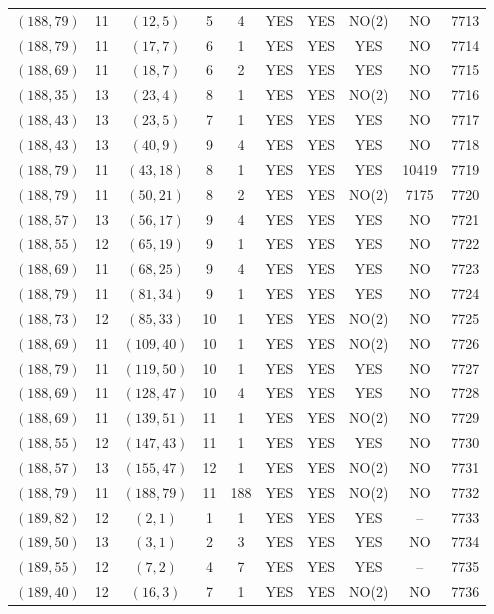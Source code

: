 \begin{longtable}{|c|c|c|c|c|c|c|c|c|c|}
$(188, 79)$ & 11 & $(12, 5)$ & 5 & 4 & YES & YES & NO(2) & NO & 7713\\
$(188, 79)$ & 11 & $(17, 7)$ & 6 & 1 & YES & YES & YES & NO & 7714\\
$(188, 69)$ & 11 & $(18, 7)$ & 6 & 2 & YES & YES & YES & NO & 7715\\
$(188, 35)$ & 13 & $(23, 4)$ & 8 & 1 & YES & YES & NO(2) & NO & 7716\\
$(188, 43)$ & 13 & $(23, 5)$ & 7 & 1 & YES & YES & YES & NO & 7717\\
$(188, 43)$ & 13 & $(40, 9)$ & 9 & 4 & YES & YES & YES & NO & 7718\\
$(188, 79)$ & 11 & $(43, 18)$ & 8 & 1 & YES & YES & YES & 10419 & 7719\\
$(188, 79)$ & 11 & $(50, 21)$ & 8 & 2 & YES & YES & NO(2) & 7175 & 7720\\
$(188, 57)$ & 13 & $(56, 17)$ & 9 & 4 & YES & YES & YES & NO & 7721\\
$(188, 55)$ & 12 & $(65, 19)$ & 9 & 1 & YES & YES & YES & NO & 7722\\
$(188, 69)$ & 11 & $(68, 25)$ & 9 & 4 & YES & YES & YES & NO & 7723\\
$(188, 79)$ & 11 & $(81, 34)$ & 9 & 1 & YES & YES & YES & NO & 7724\\
$(188, 73)$ & 12 & $(85, 33)$ & 10 & 1 & YES & YES & NO(2) & NO & 7725\\
$(188, 69)$ & 11 & $(109, 40)$ & 10 & 1 & YES & YES & NO(2) & NO & 7726\\
$(188, 79)$ & 11 & $(119, 50)$ & 10 & 1 & YES & YES & YES & NO & 7727\\
$(188, 69)$ & 11 & $(128, 47)$ & 10 & 4 & YES & YES & YES & NO & 7728\\
$(188, 69)$ & 11 & $(139, 51)$ & 11 & 1 & YES & YES & NO(2) & NO & 7729\\
$(188, 55)$ & 12 & $(147, 43)$ & 11 & 1 & YES & YES & YES & NO & 7730\\
$(188, 57)$ & 13 & $(155, 47)$ & 12 & 1 & YES & YES & NO(2) & NO & 7731\\
$(188, 79)$ & 11 & $(188, 79)$ & 11 & 188 & YES & YES & NO(2) & NO & 7732\\
$(189, 82)$ & 12 & $(2, 1)$ & 1 & 1 & YES & YES & YES & -- & 7733\\
$(189, 50)$ & 13 & $(3, 1)$ & 2 & 3 & YES & YES & YES & NO & 7734\\
$(189, 55)$ & 12 & $(7, 2)$ & 4 & 7 & YES & YES & YES & -- & 7735\\
$(189, 40)$ & 12 & $(16, 3)$ & 7 & 1 & YES & YES & NO(2) & NO & 7736\\

\end{longtable}
